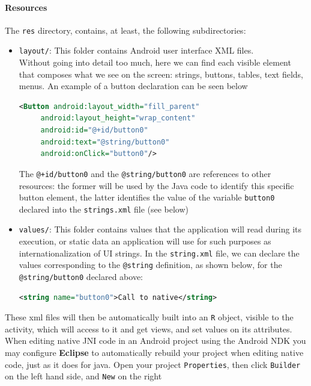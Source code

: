 \documentclass[a4paper,10pt]{article}
\newcommand{\keyword}[1]{\texttt{#1}}
\begin{document}
\begin{multicols}{2}
\paragraph{Resources}
The \keyword{res} directory, contains, at least, the following subdirectories:
\begin{itemize}
\item \keyword{layout/}: This folder contains Android user interface XML files.
\\Without going into detail too much, here we can find each visible element
that composes what we see on the screen: strings, buttons, tables, text fields, 
menus. An example of a button declaration can be seen below
\begin{lstlisting}[language=XML,
		   columns=fullflexible,
		   showstringspaces=false,
		   commentstyle=\color{gray}\upshape]
<Button android:layout_width="fill_parent"
	 android:layout_height="wrap_content"
	 android:id="@+id/button0"
	 android:text="@string/button0"
	 android:onClick="button0"/>
\end{lstlisting}
The \keyword{@+id/button0} and the \keyword{@string/button0} are references to
other resources: the former will be used by the Java code to identify this
specific button element, the latter identifies the value of the variable
\keyword{button0} declared into the \keyword{strings.xml} file (see below)
\item \keyword{values/}: This folder contains values that the application will
read during its execution, or static data an application will use for such
purposes as internationalization of UI strings. In the \keyword{string.xml}
file, we can declare the values corresponding to the \keyword{@string}
definition, as shown below, for the \keyword{@string/button0} declared above:
\begin{lstlisting}[language=XML,
		   columns=fullflexible,
		   showstringspaces=false,
		   commentstyle=\color{gray}\upshape]
<string name="button0">Call to native</string>
\end{lstlisting}
\end{itemize}
These xml files will then be automatically built into an \keyword{R} object,
visible to the activity, which will access to it and get views, and set values
on its attributes.\\
When editing native JNI code in an Android project using the Android NDK you may
configure \textbf{Eclipse} to automatically rebuild your project when editing
native code, just as it does for java. Open your project \texttt{Properties},
then click \texttt{Builder} on the left hand side, and \texttt{New} on the right

\end{multicols}
\end{document}
